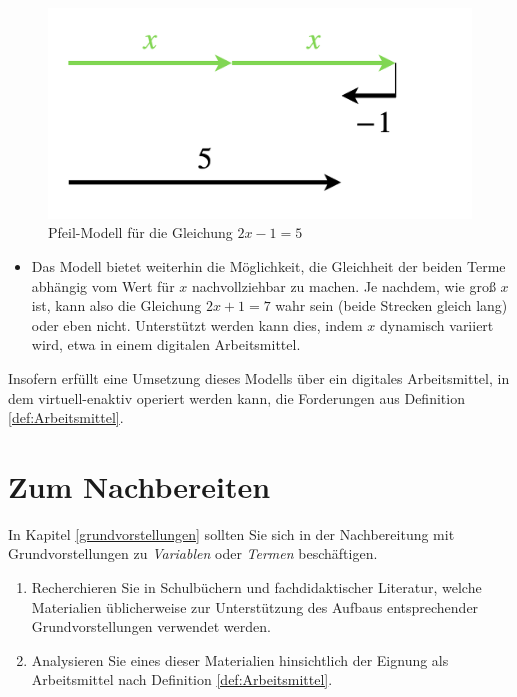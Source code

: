 \documentclass[
]{scrbook}
\providecommand{\tightlist}{%
  \setlength{\itemsep}{0pt}\setlength{\parskip}{0pt}}
\theoremstyle{definition}
\theoremstyle{definition}
\theoremstyle{definition}
\theoremstyle{definition}
\theoremstyle{remark}
\begin{document}
\begin{figure}

{\centering \includegraphics[width=0.5\linewidth]{pictures/8-negativePfeile} 

}

\caption{Pfeil-Modell für die Gleichung $2x-1 = 5$}\label{fig:negativePfeile}
\end{figure}

\begin{itemize}
\tightlist
\item
  Das Modell bietet weiterhin die Möglichkeit, die Gleichheit der beiden Terme abhängig vom Wert für \(x\) nachvollziehbar zu machen. Je nachdem, wie groß \(x\) ist, kann also die Gleichung \(2x+1 = 7\) wahr sein (beide Strecken gleich lang) oder eben nicht. Unterstützt werden kann dies, indem \(x\) dynamisch variiert wird, etwa in einem digitalen Arbeitsmittel.
\end{itemize}

Insofern erfüllt eine Umsetzung dieses Modells über ein digitales Arbeitsmittel, in dem virtuell-enaktiv operiert werden kann, die Forderungen aus Definition \ref{def:Arbeitsmittel}.

\section{Zum Nachbereiten}\label{arbeitsmittel-nachbereitung}

In Kapitel \ref{grundvorstellungen} sollten Sie sich in der Nachbereitung mit Grundvorstellungen zu \emph{Variablen} oder \emph{Termen} beschäftigen.

\begin{enumerate}
\def\labelenumi{\arabic{enumi}.}
\item
  Recherchieren Sie in Schulbüchern und fachdidaktischer Literatur, welche Materialien üblicherweise zur Unterstützung des Aufbaus entsprechender Grundvorstellungen verwendet werden.
\item
  Analysieren Sie eines dieser Materialien hinsichtlich der Eignung als Arbeitsmittel nach Definition \ref{def:Arbeitsmittel}.
\end{enumerate}
\end{document}
